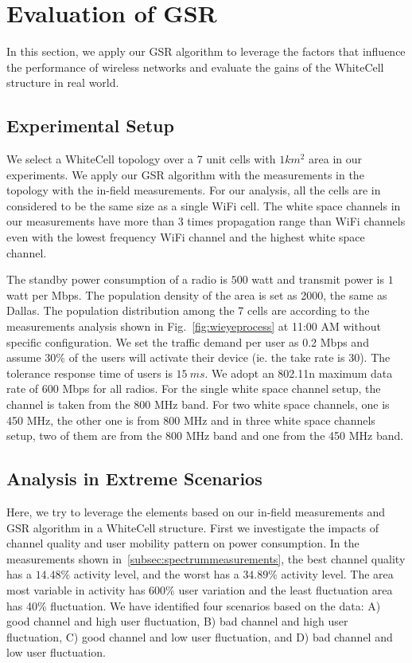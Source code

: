 \section{Evaluation of GSR}
\label{subsec:gsrevaluation}

In this section, we apply our GSR algorithm to leverage the factors that influence the performance of wireless networks
and evaluate the gains of the WhiteCell structure in real world.

\subsection{Experimental Setup}
\label{subsec:experimentsetup} 


We select a WhiteCell topology over a 7 unit cells with $1km^2$ area in our experiments. 
We apply our GSR algorithm with the measurements in the topology with the in-field measurements.
For our analysis, all the cells are in considered to be the same size as a single WiFi cell. 
The white space channels in our measurements have more than 3 times propagation range than WiFi 
channels even with the lowest frequency WiFi channel and the highest white space channel.
 
The standby power consumption of a radio is $500$ watt and transmit power is $1$ watt per Mbps.
The population density of the area is set as 2000, the same as Dallas. 
The population distribution among the 7 cells are according to the measurements analysis shown in Fig.~\ref{fig:wieyeprocess}
at 11:00 AM without specific configuration.
We set the traffic demand per user as 0.2 Mbps and assume 30\% of the users will activate their device (ie. the take rate is 30). 
The tolerance response time of users is $15\ ms$. 
We adopt an 802.11n maximum data rate of 600 Mbps for all radios. 
For the single white space channel setup, the channel is taken from the 800 MHz band. 
For two white space channels, one is 450 MHz, the other one is from 800 MHz and in
three white space channels setup, two of them are from the 800 MHz band and one from the 450 MHz band.



\subsection{Analysis in Extreme Scenarios}
\label{subsec:singlefactors}

Here, we try to leverage the elements based on our in-field measurements and GSR algorithm in a WhiteCell structure.
First we investigate the impacts of channel quality and user mobility pattern on power consumption.
In the measurements shown in~\ref{subsec:spectrummeasurements}, the best channel quality has a $14.48\%$ activity level, and the worst has a $34.89\%$ activity level. 
The area most variable in activity has 600\% user variation and the least fluctuation area has 40\% fluctuation. 
We have identified four scenarios based on the data: A) good channel and high user fluctuation, B) bad channel and high user fluctuation, C) good channel and low user fluctuation, and D) bad channel and low user fluctuation.

